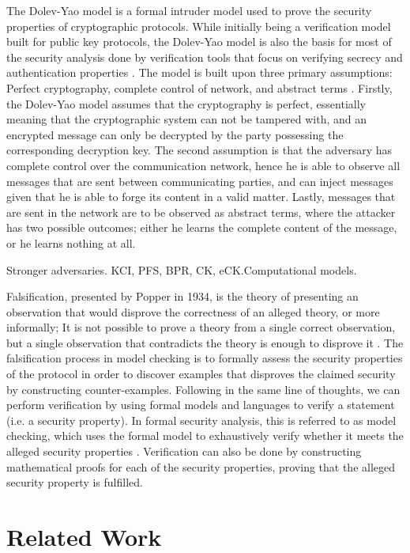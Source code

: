 
The Dolev-Yao model is a formal intruder model used to prove the security properties of cryptographic protocols. While initially being a verification model built for public key protocols, the Dolev-Yao model is also the basis for most of the security analysis done by verification tools that focus on verifying secrecy and authentication properties \cite{cremers2005operational}. The model is built upon three primary assumptions: Perfect cryptography, complete control of network, and abstract terms \cite{dolev1983security}. Firstly, the Dolev-Yao model assumes that the cryptography is perfect, essentially meaning that the cryptographic system can not be tampered with, and an encrypted message can only be decrypted by the party possessing the corresponding decryption key. The second assumption is that the adversary has complete control over the communication network, hence he is able to observe all messages that are sent between communicating parties, and can inject messages given that he is able to forge its content in a valid matter. Lastly, messages that are sent in the network are to be observed as abstract terms, where the attacker has two possible outcomes; either he learns the complete content of the message, or he learns nothing at all. 


Stronger adversaries. KCI, PFS, BPR, CK, eCK.Computational models.



Falsification, presented by Popper in 1934, is the theory of presenting an observation that would disprove the correctness of an alleged theory, or more informally; It is not possible to prove a theory from a single correct observation, but a single observation that contradicts the theory is enough to disprove it \cite{popper2005logic}. The falsification process in model checking is to formally assess the security properties of the protocol in order to discover examples that disproves the claimed security by constructing counter-examples. Following in the same line of thoughts, we can perform verification by using formal models and languages to verify a statement (i.e. a security property). In formal security analysis, this is referred to as model checking, which uses the formal model to exhaustively verify whether it meets the alleged security properties \cite{basin2011model}. Verification can also be done by constructing mathematical proofs for each of the security properties, proving that the alleged security property is fulfilled. 



\section{Related Work}


